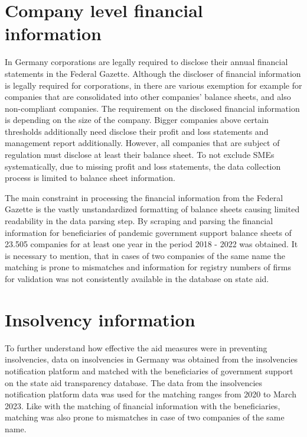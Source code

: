\section{Company level financial information}

In Germany corporations are legally required to disclose their annual financial statements in the Federal Gazette. Although the discloser of financial information is legally required for corporations, in there are various exemption for example for companies that are consolidated into other companies' balance sheets, and also non-compliant companies.
The requirement on the disclosed financial information is depending on the size of the company. Bigger companies above certain thresholds additionally need disclose their profit and loss statements and management report additionally. However, all companies that are subject of regulation must disclose at least their balance sheet. 
To not exclude SMEs systematically, due to missing profit and loss statements, the data collection process is limited to balance sheet information. 

The main constraint in processing the financial information from the Federal Gazette is the vastly unstandardized formatting of balance sheets causing limited readability in the data parsing step. By scraping and parsing the financial information for beneficiaries of pandemic government support balance sheets of 23.505 companies for at least one year in the period 2018 - 2022 was obtained. 
It is necessary to mention, that in cases of two companies of the same name the matching is prone to mismatches and information for registry numbers of firms for validation was not consistently available in the database on state aid.





\section{Insolvency information}

To further understand how effective the aid measures were in preventing insolvencies, data on insolvencies in Germany was obtained from the insolvencies notification platform and matched with the beneficiaries of government support on the state aid transparency database. 
The data from the insolvencies notification platform data was used for the matching ranges from 2020 to March 2023. Like with the matching of financial information with the beneficiaries, matching was also prone to mismatches in case of two companies of the same name.

